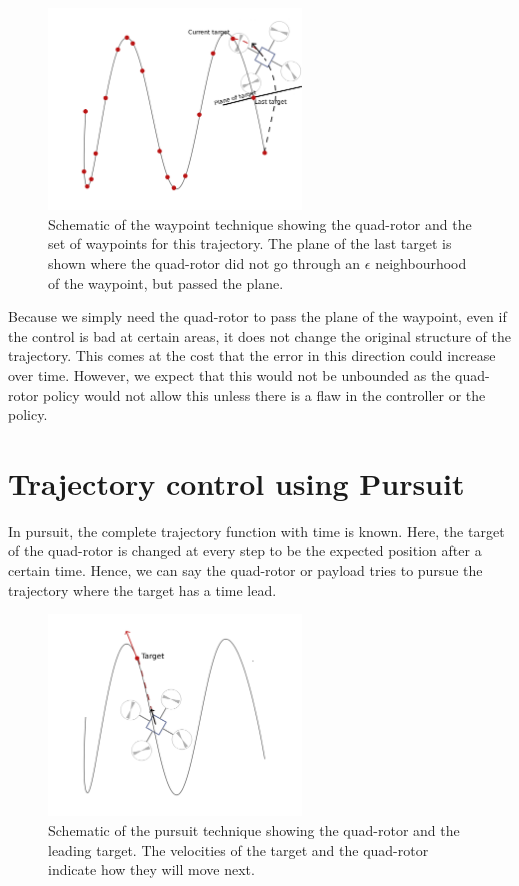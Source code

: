 \documentclass[hidelinks,BTech]{iitmdiss}
\begin{document}
\begin{figure}[H]
  \centering
    \includegraphics[width=0.6\textwidth]{waypoint.png}
    \caption{Schematic of the waypoint technique showing the quad-rotor and the set of waypoints for this trajectory. The plane of the last target is shown where the quad-rotor did not go through an $\epsilon$ neighbourhood of the waypoint, but passed the plane.}
\end{figure}

Because we simply need the quad-rotor to pass the plane of the waypoint, even if the control is bad at certain areas, it does not change the original structure of the trajectory. This comes at the cost that the error in this direction could increase over time. However, we expect that this would not be unbounded as the quad-rotor policy would not allow this unless there is a flaw in the controller or the policy.

\section{Trajectory control using Pursuit}

In pursuit, the complete trajectory function with time is known. Here, the target of the quad-rotor is changed at every step to be the expected position after a certain time. Hence, we can say the quad-rotor or payload tries to pursue the trajectory where the target has a time lead.

\begin{figure}[H]
  \centering
    \includegraphics[width=0.6\textwidth]{pursuit.png}
    \caption{Schematic of the pursuit technique showing the quad-rotor and the leading target. The velocities of the target and the quad-rotor indicate how they will move next.}
\end{figure}
\end{document}
